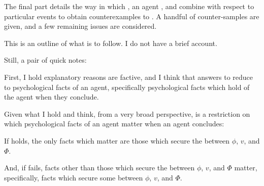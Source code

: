 \begin{note}
\begin{TOCEnum}
    The final part details the way in which , an agent , and \requ{} combine with respect to particular events to obtain counterexamples to \issueInclusion{}.
    A handful of counter-samples are given, and a few remaining issues are considered.
  \end{TOCEnum}
\end{note}

\begin{note}
  This is an outline of what is to follow.
  I do not have a brief account.

  Still, a pair of quick notes:

  First, I hold explanatory reasons are factive, and I think that answers to \qWhy{} reduce to psychological facts of an agent, specifically psychological facts which hold of the agent when they conclude.%


  Given what I hold and think, from a very broad perspective, \issueInclusion{} is a restriction on which psychological facts of an agent matter when an agent concludes:

  If \issueInclusion{} holds, the only facts which matter are those which secure the \ros{} between \(\phi\), \(v\), and \(\Phi\).

  And, if \issueInclusion{} fails, facts other than those which secure the \ros{} between \(\phi\), \(v\), and \(\Phi\) matter, specifically, facts which secure some \ros{} between \(\phi\), \(v\), and \(\Phi\).
\end{note}



